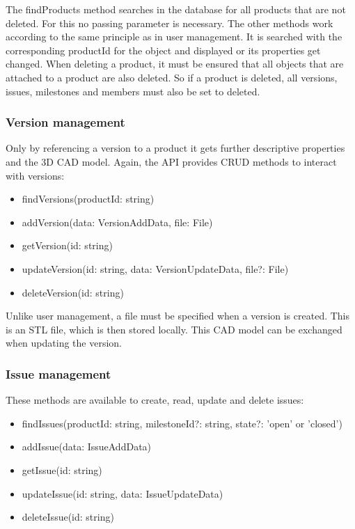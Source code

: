     The findProducts method searches in the database for all products that are not deleted. For this no passing parameter is necessary. The other methods work according to the same principle as in user management. It is searched with the corresponding productId for the object and displayed or its properties get changed. When deleting a product, it must be ensured that all objects that are attached to a product are also deleted. So if a product is deleted, all versions, issues, milestones and members must also be set to deleted.

    \subsubsection*{Version management}
    Only by referencing a version to a product it gets further descriptive properties and the 3D CAD model. Again, the API provides CRUD methods to interact with versions:

    \begin{itemize}
        \item findVersions(productId: string)
        \item addVersion(data: VersionAddData, file: File)
        \item getVersion(id: string)
        \item updateVersion(id: string, data: VersionUpdateData, file?: File)
        \item deleteVersion(id: string)
    \end{itemize}

    Unlike user management, a file must be specified when a version is created. This is an STL file, which is then stored locally. This CAD model can be exchanged when updating the version.

    \subsubsection*{Issue management} 
    These methods are available to create, read, update and delete issues:
    \begin{itemize}
        \item findIssues(productId: string, milestoneId?: string, state?: 'open' or 'closed')
        \item addIssue(data: IssueAddData)
        \item getIssue(id: string)
        \item updateIssue(id: string, data: IssueUpdateData)
        \item deleteIssue(id: string)
    \end{itemize}

